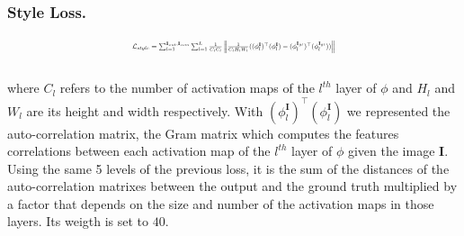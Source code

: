 \documentclass[10pt,twocolumn,letterpaper]{article}
\newcommand\norm[1]{\left\lVert#1\right\rVert}
\begin{document}
\subsubsection{Style Loss.}
\begin{equation}
    \resizebox{.47 \textwidth}{!}{%
        $\mathcal{L}_{style} = \sum^{\mathbf{I}_{out},\mathbf{I}_{com}}_{l=1} \sum^L_{l=1} \frac{1}{C_l C_l} \norm{ \frac{1}{C_l H_l W_l} ((\phi^{\mathbf{I}}_l)^\top(\phi^{\mathbf{I}}_l) - (\phi^{\mathbf{I}_{gt}}_l)^\top(\phi^{\mathbf{I}_{gt}}_l)  )}$%
}
\end{equation}
\\
where \(C_l\) refers to the number of activation maps of the \(l^{th}\) layer of \(\phi\) and \(H_l\) and \(W_l\) are its height and width respectively. With \((\phi^{\mathbf{I}}_l)^\top(\phi^{\mathbf{I}}_l)\) we represented the auto-correlation matrix, the Gram matrix\cite{gatys1508neural} which computes the features correlations between each activation map of the \(l^{th}\) layer of \(\phi\) given the image \(\mathbf{I}\).
\\
Using the same 5 levels of the previous loss, it is the sum of the distances of the auto-correlation matrixes between the output and the ground truth multiplied by a factor that depends on the size and number of the activation maps in those layers. Its weigth is set to \(40\).
\end{document}
